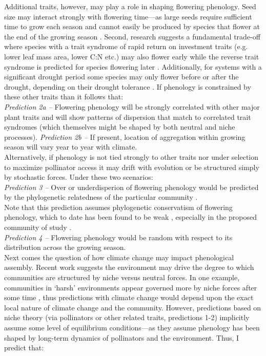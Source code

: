 \documentclass[12pt,a4paper,oneside]{article}
\begin{document}
Additional traits, however, may play a role in shaping flowering phenology. Seed size may interact strongly with flowering time---as large seeds require sufficient time to grow each season and cannot easily be produced by species that flower at the end of the growing season \citep{Mazer:1989in}. Second, research suggests a fundamental trade-off where species with a trait syndrome of rapid return on investment traits (e.g. lower leaf mass area, lower C:N etc.) may also flower early while the reverse trait syndrome is predicted for species flowering later \citep{Aldridge:2011,Craine:2012kl,tansley}. Additionally, for systems with a significant drought period some species may only flower before or after the drought, depending on their drought tolerance \citep{Craine:2012kl}. If phenology is constrained by these other traits than it follows that: \\
\emph{Prediction 2a --} Flowering phenology will be strongly correlated with other major plant traits and will show patterns of dispersion that match to correlated trait syndromes (which themselves might be shaped by both neutral and niche processes). \emph{Prediction 2b --} If present, location of aggregation within growing season will vary year to year with climate. 
\vspace{1.5ex}\\
Alternatively, if phenology is not tied strongly to other traits nor under selection to maximize pollinator access it may drift with evolution \citep{Lechowicz:1984cr} or be structured simply by stochastic forces. Under these two scenarios:\\
\emph{Prediction 3 --} Over or underdisperion of flowering phenology would be predicted by the phylogenetic relatedness of the particular community \citep{davies2012eco}.\\
Note that this prediction assumes phylogenetic conservatism of flowering phenology, which to date has been found to be weak \citep{davies2013}, especially in the proposed community of study  \citep{davies2013,CaraDonna2015}.\\
\emph{Prediction 4 --} Flowering phenology would be random with respect to its distribution across the growing season. \\
Next comes the question of how climate change may impact phenological assembly. Recent work suggests the environment may drive the degree to which communities are structured by niche versus neutral forces. In one example, communities in `harsh' environments appear governed more by niche forces after some time \citep{Chase:2007yt}, thus predictions with climate change would depend upon the exact local nature of climate change and the community. However, predictions based on niche theory (via pollinators or other related traits, predictions 1-2) implicitly assume some level of equilibrium conditions---as they assume phenology has been shaped by long-term dynamics of pollinators and the environment. Thus, I predict that:\\
\end{document}
